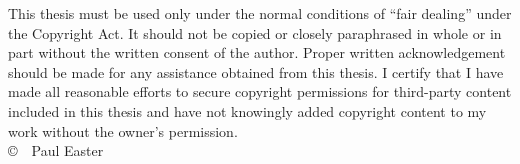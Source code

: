 \documentclass[../Thesis.tex]{subfiles}
\begin{document}
\noindent This thesis must be used only under the normal conditions of “fair dealing” under the Copyright Act. It should not be copied or closely paraphrased in whole or in part without the written consent of the author. Proper written acknowledgement should be made for any assistance obtained from this thesis. I certify that I have made all reasonable efforts to secure copyright permissions for third-party content included in this thesis and have not knowingly added copyright content to my work without the owner’s permission.
\\[1cm]
\copyright\ \  Paul Easter
\end{document}

